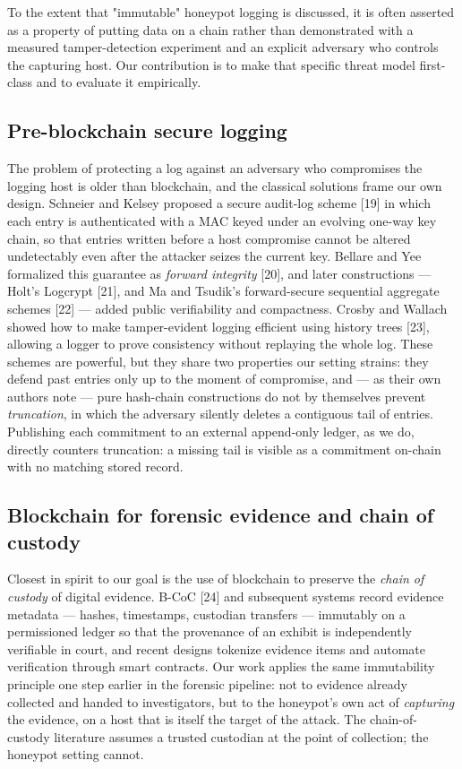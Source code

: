 \documentclass[conference]{IEEEtran}
\begin{document}
To the extent that "immutable" honeypot logging is discussed, it is often asserted as a property of putting data on a chain rather than demonstrated with a measured tamper-detection experiment and an explicit adversary who controls the capturing host. Our contribution is to make that specific threat model first-class and to evaluate it empirically.

\subsection{Pre-blockchain secure logging}

The problem of protecting a log against an adversary who compromises the logging host is older than blockchain, and the classical solutions frame our own design. Schneier and Kelsey proposed a secure audit-log scheme [19] in which each entry is authenticated with a MAC keyed under an evolving one-way key chain, so that entries written before a host compromise cannot be altered undetectably even after the attacker seizes the current key. Bellare and Yee formalized this guarantee as \emph{forward integrity} [20], and later constructions --- Holt's Logcrypt [21], and Ma and Tsudik's forward-secure sequential aggregate schemes [22] --- added public verifiability and compactness. Crosby and Wallach showed how to make tamper-evident logging efficient using history trees [23], allowing a logger to prove consistency without replaying the whole log. These schemes are powerful, but they share two properties our setting strains: they defend past entries only up to the moment of compromise, and --- as their own authors note --- pure hash-chain constructions do not by themselves prevent \emph{truncation}, in which the adversary silently deletes a contiguous tail of entries. Publishing each commitment to an external append-only ledger, as we do, directly counters truncation: a missing tail is visible as a commitment on-chain with no matching stored record.

\subsection{Blockchain for forensic evidence and chain of custody}

Closest in spirit to our goal is the use of blockchain to preserve the \emph{chain of custody} of digital evidence. B-CoC [24] and subsequent systems record evidence metadata --- hashes, timestamps, custodian transfers --- immutably on a permissioned ledger so that the provenance of an exhibit is independently verifiable in court, and recent designs tokenize evidence items and automate verification through smart contracts. Our work applies the same immutability principle one step earlier in the forensic pipeline: not to evidence already collected and handed to investigators, but to the honeypot's own act of \emph{capturing} the evidence, on a host that is itself the target of the attack. The chain-of-custody literature assumes a trusted custodian at the point of collection; the honeypot setting cannot.
\end{document}
